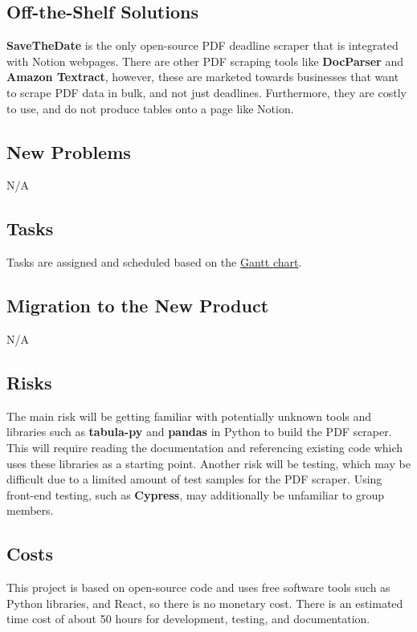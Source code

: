 \documentclass[12pt, titlepage]{article}
\begin{document}
\subsection{Off-the-Shelf Solutions}
\textbf{SaveTheDate} is the only open-source PDF deadline scraper that is integrated with Notion webpages. There are other PDF scraping tools like \textbf{DocParser} and 
\textbf{Amazon Textract}, however, these are marketed towards businesses that want to scrape PDF data in bulk, and not just deadlines. Furthermore, they are costly to use, and do not produce tables onto a page like Notion.

\subsection{New Problems}
N/A

\subsection{Tasks}
Tasks are assigned and scheduled based on the \href{https://gitlab.cas.mcmaster.ca/se3xa3_l03_g17/se3xa3_l03_g17/-/blob/main/ProjectSchedule/3XA3_L03_G17_GanttChart.pdf}{Gantt chart}.

\subsection{Migration to the New Product}
N/A

\subsection{Risks}
The main risk will be getting familiar with potentially unknown tools and libraries such as \textbf{tabula-py} and \textbf{pandas} in Python to build the PDF scraper. This will require reading the documentation and referencing existing code which uses these libraries as a starting point. Another risk will be testing, which may be difficult due to a limited amount of test samples for  the PDF scraper. Using front-end testing, such as \textbf{Cypress}, may additionally be unfamiliar to group members.

\subsection{Costs}
This project is based on open-source code and uses free software tools such as Python libraries, and React, so there is no monetary cost. There is an estimated time cost of about 50 hours for development, testing, and documentation.
\end{document}
